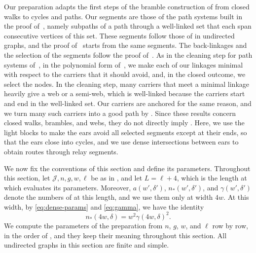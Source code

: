 \documentclass[fontsize=12pt,leading=14pt]{fullpaper}
\newcommand{\Jcal}{\mathcal{J}}
\newcounter{step}
\begin{document}
Our preparation adapts the first steps of the bramble construction of \textcite{CLNS26} from closed walks to cycles and paths.
Our segments are those of the path systems built in the proof of~\cite[Lemma~4.6]{KawarabayashiK15}, namely subpaths of a path through a well-linked set that each span consecutive vertices of this set.
These segments follow those of \textcite[Lemma~3.2]{RW12} in undirected graphs, and the proof of~\cite[Theorem~6.1]{CLNS26} starts from the same segments.
The back-linkages and the selection of the segments follow the proof of~\cite[Lemma~4.13]{CLNS26}.
As in the cleaning step for path systems of~\cite[Lemma~4.7]{KawarabayashiK15}, in the polynomial form of~\cite[Lemma~5.11]{HKMM26a}, we make each of our linkages minimal with respect to the carriers that it should avoid, and, in the closed outcome, we select the nodes.
In the cleaning step, many carriers that meet a minimal linkage heavily give a web or a semi-web, which is well-linked because the carriers start and end in the well-linked set.
Our carriers are anchored for the same reason, and we turn many such carriers into a good path by .
Since these results concern closed walks, brambles, and webs, they do not directly imply .
Here, we use the light blocks to make the ears avoid all selected segments except at their ends, so that the ears close into cycles, and we use dense intersections between ears to obtain routes through relay segments.

We now fix the conventions of this section and define its parameters.
Throughout this section, let $\Jcal,n,g,w,\ell$ be as in , and let $L=\ell+4$, which is the length at which  evaluates its parameters.
Moreover, $a(w',\delta')$, $n_*(w',\delta')$, and $\gamma(w',\delta')$ denote the numbers of  at this length, and we use them only at width $4w$.
At this width, by \eqref{eq:dense-params} and \eqref{eq:gamma}, we have the identity
\begin{equation}\label{eq:prep-density-identity}
  n_*(4w,\delta)=w^2\gamma(4w,\delta)^2.
\end{equation}
We compute the parameters of the preparation from $n$, $g$, $w$, and $\ell$ row by row, in the order of , and they keep their meaning throughout this section.
All undirected graphs in this section are finite and simple.
\end{document}
